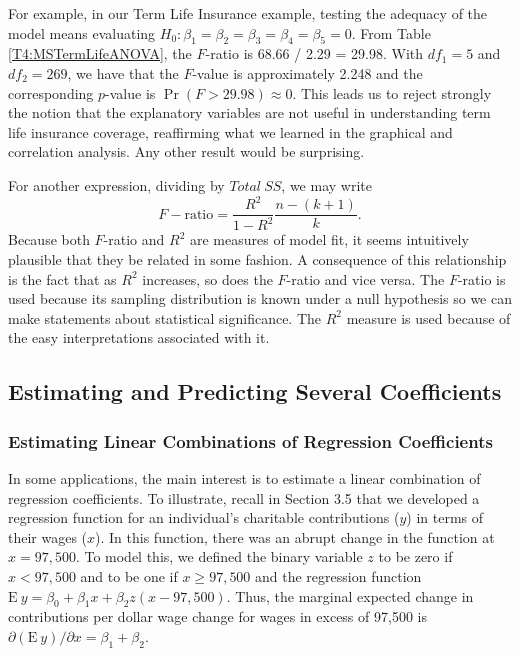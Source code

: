 For example, in our Term Life Insurance example, testing the
adequacy of the model means evaluating $H_0: \beta_1 = \beta_2
=\beta_3 =\beta_4 =\beta_5 = 0$. From Table
\ref{T4:MSTermLifeANOVA}, the $F$-ratio is 68.66 / 2.29 = 29.98.
With $df_1=5$ and $df_2 = 269$, we have that the $F$-value is
approximately 2.248 and the corresponding $p$-value is $\Pr(F >
29.98) \approx 0$. This leads us to reject strongly the notion that
the explanatory variables are not useful in understanding term life
insurance coverage, reaffirming what we learned in the graphical and
correlation analysis. Any other result would be surprising.

For another expression, dividing by $Total~SS$, we may write
\begin{equation*}
F-\textrm{ratio}=\frac{R^2}{1-R^2}\frac{n-(k+1)}{k}.
\end{equation*}%
Because both $F$-ratio and $R^2$ are measures of model fit, it seems
intuitively plausible that they be related in some fashion. A
consequence of this relationship is the fact that as $R^2$
increases, so does the $F$-ratio and vice versa. The $F$-ratio is
used because its sampling distribution is known under a null
hypothesis so we can make statements about statistical significance.
The $R^2$ measure is used because of the easy interpretations
associated with it.

\subsection{Estimating and Predicting Several Coefficients}\label{S4:SetsInference}

\subsubsection*{Estimating Linear Combinations of Regression Coefficients}

In some applications, the main interest is to estimate a linear
combination of regression coefficients. To illustrate, recall in
Section 3.5 that we developed a regression function for an
individual's charitable contributions ($y$) in terms of their wages
($x$). In this function, there was an abrupt change in the function
at $x=97,500$. To model this, we defined the binary variable $z$ to
be zero if $x<97,500$ and to be one if $x\geq 97,500$ and the
regression function $\mathrm{E~}y=\beta_0+\beta_1x+\beta
_2z(x-97,500)$. Thus, the marginal expected change in contributions
per dollar wage change for wages in excess of 97,500 is $\partial
\left( \mathrm{E~}y\right) /\partial x=\beta_1+\beta _2$.

